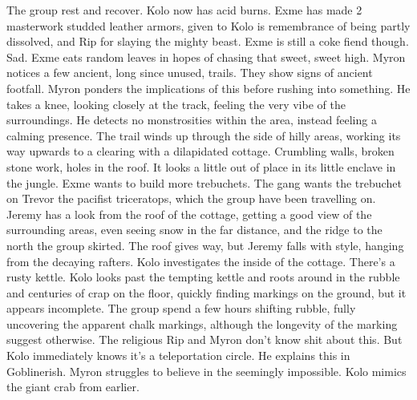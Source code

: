 \begin{multicols}{2}
The group rest and recover. Kolo now has acid burns. Exme has made 2 masterwork studded leather armors, given to Kolo is remembrance of being partly dissolved, and Rip for slaying the mighty beast. Exme is still a coke fiend though. Sad. Exme eats random leaves in hopes of chasing that sweet, sweet high. Myron notices a few ancient, long since unused, trails. They show signs of ancient footfall. Myron ponders the implications of this before rushing into something. He takes a knee, looking closely at the track, feeling the very vibe of the surroundings. He detects no monstrosities within the area, instead feeling a calming presence. The trail winds up through the side of hilly areas, working its way upwards to a clearing with a dilapidated cottage. Crumbling walls, broken stone work, holes in the roof. It looks a little out of place in its little enclave in the jungle. Exme wants to build more trebuchets. The gang wants the trebuchet on Trevor the pacifist triceratops, which the group have been travelling on. Jeremy has a look from the roof of the cottage, getting a good view of the surrounding areas, even seeing snow in the far distance, and the ridge to the north the group skirted. The roof gives way, but Jeremy falls with style, hanging from the decaying rafters. Kolo investigates the inside of the cottage. There’s a rusty kettle. Kolo looks past the tempting kettle and roots around in the rubble and centuries of crap on the floor, quickly finding markings on the ground, but it appears incomplete. The group spend a few hours shifting rubble, fully uncovering the apparent chalk markings, although the longevity of the marking suggest otherwise. The religious Rip and Myron don’t know shit about this. But Kolo immediately knows it’s a teleportation circle. He explains this in Goblinerish. Myron struggles to believe in the seemingly impossible. Kolo mimics the giant crab from earlier.\medskip


\end{multicols}
